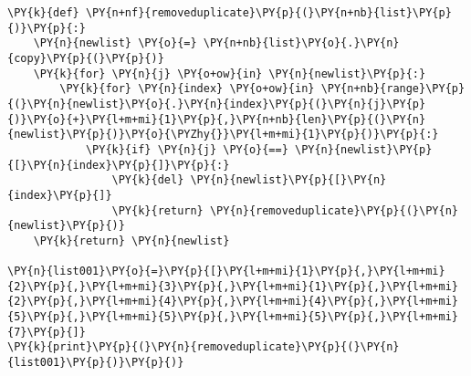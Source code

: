 \begin{Verbatim}[commandchars=\\\{\}]
\PY{k}{def} \PY{n+nf}{removeduplicate}\PY{p}{(}\PY{n+nb}{list}\PY{p}{)}\PY{p}{:}
    \PY{n}{newlist} \PY{o}{=} \PY{n+nb}{list}\PY{o}{.}\PY{n}{copy}\PY{p}{(}\PY{p}{)}
    \PY{k}{for} \PY{n}{j} \PY{o+ow}{in} \PY{n}{newlist}\PY{p}{:}
        \PY{k}{for} \PY{n}{index} \PY{o+ow}{in} \PY{n+nb}{range}\PY{p}{(}\PY{n}{newlist}\PY{o}{.}\PY{n}{index}\PY{p}{(}\PY{n}{j}\PY{p}{)}\PY{o}{+}\PY{l+m+mi}{1}\PY{p}{,}\PY{n+nb}{len}\PY{p}{(}\PY{n}{newlist}\PY{p}{)}\PY{o}{\PYZhy{}}\PY{l+m+mi}{1}\PY{p}{)}\PY{p}{:}
            \PY{k}{if} \PY{n}{j} \PY{o}{==} \PY{n}{newlist}\PY{p}{[}\PY{n}{index}\PY{p}{]}\PY{p}{:}
                \PY{k}{del} \PY{n}{newlist}\PY{p}{[}\PY{n}{index}\PY{p}{]}
                \PY{k}{return} \PY{n}{removeduplicate}\PY{p}{(}\PY{n}{newlist}\PY{p}{)}
    \PY{k}{return} \PY{n}{newlist}

\PY{n}{list001}\PY{o}{=}\PY{p}{[}\PY{l+m+mi}{1}\PY{p}{,}\PY{l+m+mi}{2}\PY{p}{,}\PY{l+m+mi}{3}\PY{p}{,}\PY{l+m+mi}{1}\PY{p}{,}\PY{l+m+mi}{2}\PY{p}{,}\PY{l+m+mi}{4}\PY{p}{,}\PY{l+m+mi}{4}\PY{p}{,}\PY{l+m+mi}{5}\PY{p}{,}\PY{l+m+mi}{5}\PY{p}{,}\PY{l+m+mi}{5}\PY{p}{,}\PY{l+m+mi}{7}\PY{p}{]}
\PY{k}{print}\PY{p}{(}\PY{n}{removeduplicate}\PY{p}{(}\PY{n}{list001}\PY{p}{)}\PY{p}{)}
\end{Verbatim}
